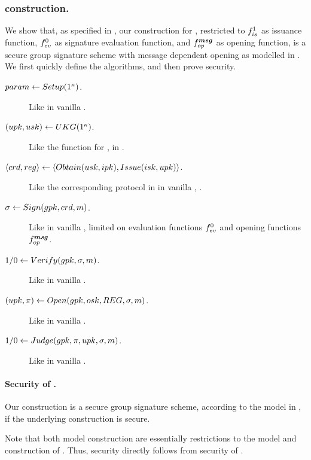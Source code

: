 \subsubsection{\CUASGSMDO construction.} %
We show that, as specified in , our \CUASGen
construction for \UAS, restricted to $f_{is}^1$ as issuance function,
$f_{ev}^0$ as signature evaluation function, and $f_{op}^{\boldsymbol{msg}}$ as opening
function, is a secure group signature scheme with message dependent opening
as modelled in . We first quickly define the algorithms,
and then prove security.

\begin{description}
\item[$param \gets Setup(1^\kappa)$.] Like in vanilla \CUASGen.
\item[$(upk,usk) \gets UKG(1^\kappa)$.] Like the \UKeyGen function for
  \CUASGS, in .
\item[$\langle crd,reg \rangle \gets
  \langle Obtain(usk,ipk),Issue(isk,upk)\rangle$.] Like the corresponding
  protocol in in vanilla \CUASGS, .
\item[$\sigma \gets Sign(gpk,crd,m)$.] Like in vanilla \CUASGen, limited
  on evaluation functions $f_{ev}^0$ and opening functions $f_{op}^{\boldsymbol{msg}}$.
\item[$1/0 \gets Verify(gpk,\sigma,m)$.] Like in vanilla \CUASGen.
\item[$(\upk,\pi) \gets \Open(\gpk,\osk,\trans,\sig,\msg)$.] Like in vanilla
  \CUASGen.
\item[$1/0 \gets Judge(gpk,\pi,upk,\sigma,m)$.] Like in vanilla \CUASGen.
\end{description}

\paragraph{Security of \CUASGSMDO.} %
Our \CUASGSMDO construction is a secure group signature scheme,
according to the model in , if the underlying \CUASGen
construction is secure.

Note that both  model construction are essentially restrictions to the model
and construction of \CUASGen. Thus, security directly follows from security of
\CUASGen.


